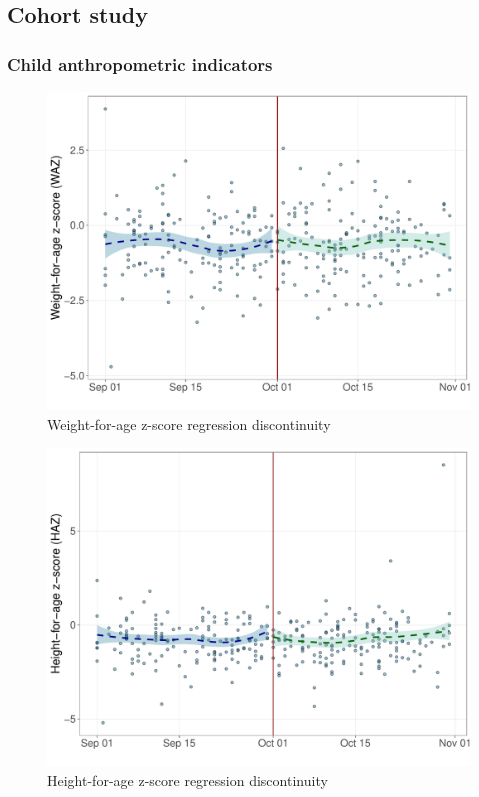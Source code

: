 \documentclass[12pt,a4paper]{article}
\begin{document}
\hypertarget{study2-results}{%
\subsection{Cohort study}\label{study2-results}}

\hypertarget{child-anthropometric-indicators}{%
\subsubsection{Child anthropometric indicators}\label{child-anthropometric-indicators}}

\begin{figure}[H]

{\centering \includegraphics{kayahReport_files/figure-latex/rd2-1} 

}

\caption{Weight-for-age z-score regression discontinuity}\label{fig:rd2}
\end{figure}

\begin{figure}[H]

{\centering \includegraphics{kayahReport_files/figure-latex/rd3-1} 

}

\caption{Height-for-age z-score regression discontinuity}\label{fig:rd3}
\end{figure}
\end{document}
